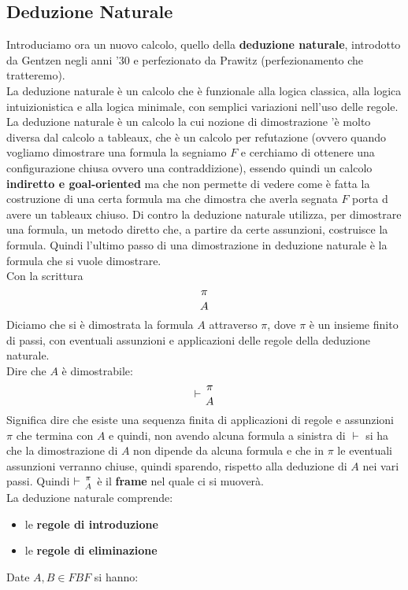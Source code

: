 \documentclass[a4paper,12pt, oneside]{book}
\newcommand*{\bfrac}[2]{\genfrac{}{}{0pt}{}{#1}{#2}}
\begin{document}
\subsection{Deduzione Naturale}
Introduciamo ora un nuovo calcolo, quello della \textbf{deduzione naturale},
introdotto da Gentzen negli anni '30 e perfezionato da Prawitz (perfezionamento
che tratteremo).\\
La deduzione naturale è un calcolo che è funzionale alla logica classica, alla
logica intuizionistica e alla logica minimale, con semplici variazioni nell'uso
delle regole.\\
La deduzione naturale è un calcolo la cui nozione di dimostrazione 'è molto
diversa dal calcolo a tableaux, che è un calcolo per refutazione (ovvero quando
vogliamo dimostrare una formula la segniamo $F$ e cerchiamo di ottenere una
configurazione chiusa ovvero una contraddizione), essendo quindi un calcolo
\textbf{indiretto e goal-oriented} ma che non permette di vedere come è fatta la
costruzione di una certa formula ma che dimostra che averla segnata $F$ porta d
avere un tableaux chiuso. Di contro la deduzione naturale utilizza, per
dimostrare una formula, un metodo diretto che, a partire da certe assunzioni,
costruisce la formula. Quindi l'ultimo passo di una dimostrazione in deduzione
naturale è la formula che si vuole dimostrare. \\
Con la scrittura
\[\bfrac{\pi}{A}\]
Diciamo che si è dimostrata la formula $A$ attraverso $\pi$, dove $\pi$ è un
insieme finito di passi, con eventuali assunzioni e applicazioni delle regole
della deduzione naturale.\\
Dire che $A$ è dimostrabile:
\[\vdash\bfrac{\pi}{A}\]
Significa dire che esiste una sequenza finita di applicazioni di regole e
assunzioni $\pi$ che termina con $A$ e quindi, non avendo alcuna formula a
sinistra di $\vdash$ si ha che la dimostrazione di $A$ non dipende da alcuna
formula e che in $\pi$ le eventuali assunzioni verranno chiuse, quindi sparendo,
rispetto alla deduzione di $A$ nei vari passi. Quindi $\vdash\bfrac{\pi}{A}$ è
il \textbf{frame} nel quale ci si muoverà.\\
La deduzione naturale comprende:
\begin{itemize}
  \item le \textbf{regole di introduzione}
  \item le \textbf{regole di eliminazione}
\end{itemize}
Date $A,B\in FBF$ si hanno:
\end{document}
